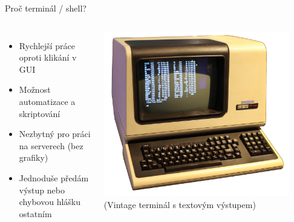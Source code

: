 \documentclass{beamer}
\begin{document}
\begin{frame}{Proč terminál / shell?}
  \begin{columns}[c]
    \begin{itemize}
      \item Rychlejší práce oproti klikání v GUI
      \item Možnost automatizace a skriptování
      \item Nezbytný pro práci na serverech (bez grafiky)
      \item Jednoduše předám výstup nebo chybovou hlášku ostatním
    \end{itemize}


    \centering
    \includegraphics[width=0.9\textwidth]{terminal.png}
    \vspace{0.5em}\\
    {\small (Vintage terminál s textovým výstupem)}
  \end{columns}
\end{frame}
\end{document}
